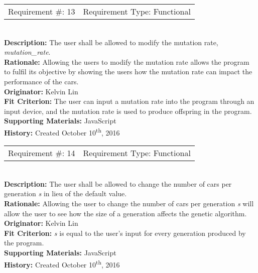\documentclass[12pt, titlepage]{article}
\begin{document}
\begin{reqbox}
%
\begin{tabular}{cc}
Requirement \#: 13 & Requirement Type: Functional \\
\end{tabular} \\
%
\textbf{Description:} The user shall be allowed to modify the mutation rate, 
\textit{mutation\_rate}. \\
\textbf{Rationale:} Allowing the users to modify the mutation rate allows the 
program to fulfil its objective by showing the users how the mutation rate can 
impact the performance of the cars. \\
\textbf{Originator:} Kelvin Lin\\
\textbf{Fit Criterion:} The user can input a mutation rate into the program 
through an input device, and the mutation rate is used to produce offspring in 
the program.\\
%  
\textbf{Supporting Materials:} JavaScript \\
\textbf{History:} Created October 10\textsuperscript{th}, 2016
%
\end{reqbox}

\newpage

\begin{reqbox}
%
\begin{tabular}{cc}
Requirement \#: 14 & Requirement Type: Functional \\
\end{tabular} \\
%
\textbf{Description:} The user shall be allowed to change the number of cars per 
generation \textit{s} in lieu of the default value. \\
\textbf{Rationale:} Allowing the user to change the number of cars per 
generation \textit{s} will allow the user to see how the size of a generation 
affects the genetic algorithm. \\
\textbf{Originator:} Kelvin Lin\\
\textbf{Fit Criterion:} \textit{s} is equal to the user's input for every 
generation produced by the program.\\
%  
\textbf{Supporting Materials:} JavaScript \\
\textbf{History:} Created October 10\textsuperscript{th}, 2016
%
\end{reqbox}
\end{document}
